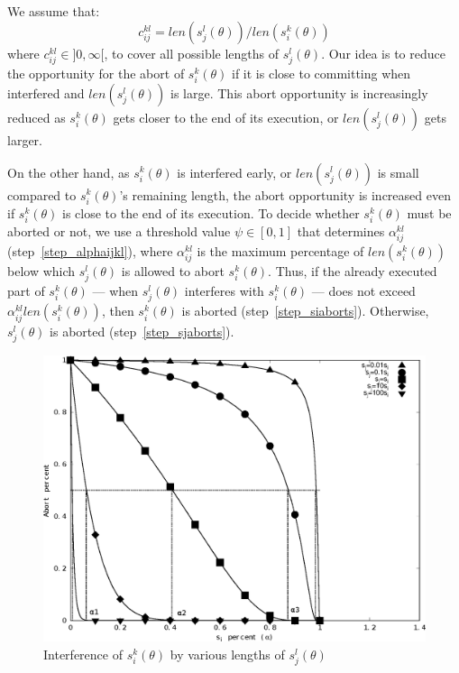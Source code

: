 We assume that:
\begin{equation}
c_{ij}^{kl}=len(s_{j}^{l}(\theta))/len(s_{i}^{k}(\theta))
\label{cm_eq}\end{equation}
where $c_{ij}^{kl}\in]0,\infty[$, to cover all possible lengths of $s_{j}^{l}(\theta)$.
Our idea is to reduce the opportunity for the abort of $s_{i}^{k}(\theta)$ if it is close to committing when interfered and $len(s_{j}^{l}(\theta))$ is large. This abort opportunity is increasingly reduced as $s_{i}^{k}(\theta)$ gets closer to the end of its execution, or $len(s_{j}^{l}(\theta))$ gets larger. 

On the other hand, as $s_{i}^{k}(\theta)$ is interfered early,
or $len(s_{j}^{l}(\theta))$ is small compared to $s_{i}^{k}(\theta)$'s remaining length, the abort opportunity 
is increased even if $s_i^k (\theta)$ is close to the end of its execution. To decide whether $s_{i}^{k}(\theta)$ must be aborted or not, we use a threshold value $\psi\in[0,1]$ that determines $\alpha_{ij}^{kl}$ (step~\ref{step_alphaijkl}), where $\alpha_{ij}^{kl}$ is the maximum percentage of $len(s_i^k(\theta))$ below which $s_j^l(\theta)$ is allowed to abort $s_i^k(\theta)$. Thus, if the already executed part of $s_i^k(\theta)$ --- when $s_j^l(\theta)$ interferes with $s_i^k(\theta)$ --- does not exceed $\alpha_{ij}^{kl}len(s_i^k(\theta))$, then $s_i^k(\theta)$ is aborted (step~\ref{step_siaborts}). Otherwise, $s_j^l(\theta)$ is aborted (step~\ref{step_sjaborts}).

%
\begin{figure}[htbp]
\centering
\includegraphics[scale=0.4]{figures/figure16}
\caption{\label{fig16}Interference of $s_{i}^{k}(\theta)$ by various lengths of 
$s_{j}^{l}(\theta)$}
\end{figure}

